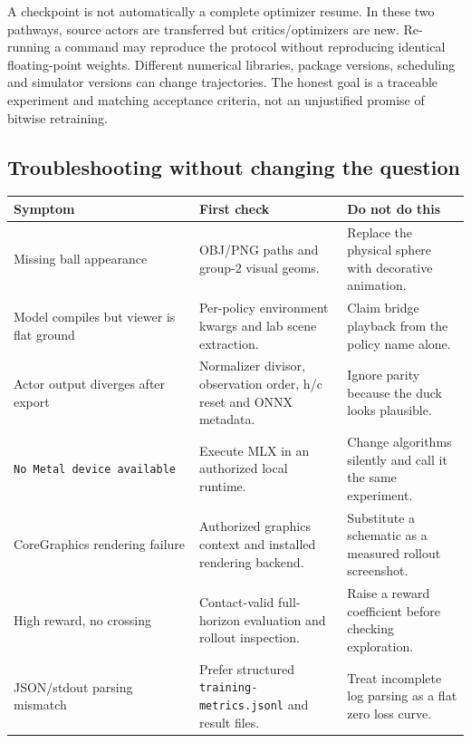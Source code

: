\documentclass[
  american,
  11pt,
  letterpaper,
]{article}
\newcounter{none} %
\begin{document}
A checkpoint is not automatically a complete optimizer resume. In these
two pathways, source actors are transferred but critics/optimizers are
new. Re-running a command may reproduce the protocol without reproducing
identical floating-point weights. Different numerical libraries, package
versions, scheduling and simulator versions can change trajectories. The
honest goal is a traceable experiment and matching acceptance criteria,
not an unjustified promise of bitwise retraining.

\subsection{Troubleshooting without changing the
question}\label{troubleshooting-without-changing-the-question}

{\def\LTcaptype{none} %
\begin{longtable}[]{@{}
  >{\raggedright\arraybackslash}p{}
  >{\raggedright\arraybackslash}p{}
  >{\raggedright\arraybackslash}p{}@{}}
\toprule\noalign{}
\begin{minipage}[b]{\linewidth}\raggedright
Symptom
\end{minipage} & \begin{minipage}[b]{\linewidth}\raggedright
First check
\end{minipage} & \begin{minipage}[b]{\linewidth}\raggedright
Do not do this
\end{minipage} \\
\midrule\noalign{}
\endhead
\bottomrule\noalign{}
\endlastfoot
Missing ball appearance & OBJ/PNG paths and group-2 visual geoms. &
Replace the physical sphere with decorative animation. \\
Model compiles but viewer is flat ground & Per-policy environment kwargs
and lab scene extraction. & Claim bridge playback from the policy name
alone. \\
Actor output diverges after export & Normalizer divisor, observation
order, h/c reset and ONNX metadata. & Ignore parity because the duck
looks plausible. \\
\texttt{No\ Metal\ device\ available} & Execute MLX in an authorized
local runtime. & Change algorithms silently and call it the same
experiment. \\
CoreGraphics rendering failure & Authorized graphics context and
installed rendering backend. & Substitute a schematic as a measured
rollout screenshot. \\
High reward, no crossing & Contact-valid full-horizon evaluation and
rollout inspection. & Raise a reward coefficient before checking
exploration. \\
JSON/stdout parsing mismatch & Prefer structured
\texttt{training\allowbreak{}-\allowbreak{}metrics.\allowbreak{}jsonl}
and result files. & Treat incomplete log parsing as a flat zero loss
curve. \\
\end{longtable}
}
\end{document}
